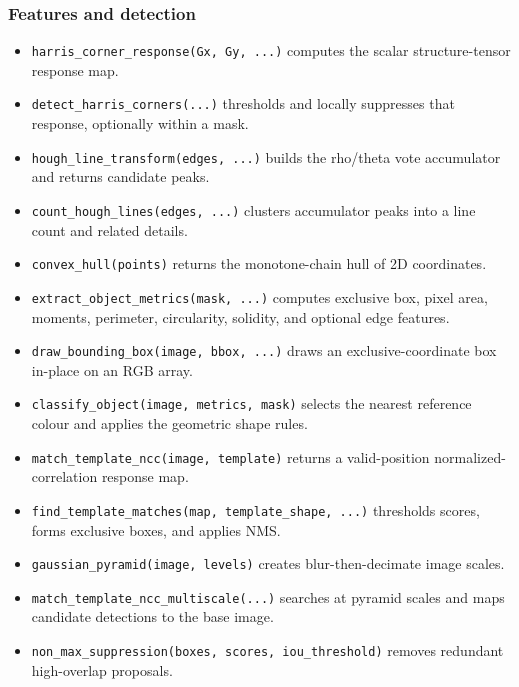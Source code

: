 \documentclass[11pt,a4paper]{article}
\newcommand{\1}{\mathbf{1}}
\begin{document}
\subsubsection{Features and detection}
\begin{itemize}
 \item \texttt{harris\_corner\_response(Gx, Gy, ...)} computes the scalar structure-tensor response map.
 \item \texttt{detect\_harris\_corners(...)} thresholds and locally suppresses that response, optionally within a mask.
 \item \texttt{hough\_line\_transform(edges, ...)} builds the rho/theta vote accumulator and returns candidate peaks.
 \item \texttt{count\_hough\_lines(edges, ...)} clusters accumulator peaks into a line count and related details.
 \item \texttt{convex\_hull(points)} returns the monotone-chain hull of 2D coordinates.
 \item \texttt{extract\_object\_metrics(mask, ...)} computes exclusive box, pixel area, moments, perimeter, circularity, solidity, and optional edge features.
 \item \texttt{draw\_bounding\_box(image, bbox, ...)} draws an exclusive-coordinate box in-place on an RGB array.
 \item \texttt{classify\_object(image, metrics, mask)} selects the nearest reference colour and applies the geometric shape rules.
 \item \texttt{match\_template\_ncc(image, template)} returns a valid-position normalized-correlation response map.
 \item \texttt{find\_template\_matches(map, template\_shape, ...)} thresholds scores, forms exclusive boxes, and applies NMS.
 \item \texttt{gaussian\_pyramid(image, levels)} creates blur-then-decimate image scales.
 \item \texttt{match\_template\_ncc\_multiscale(...)} searches at pyramid scales and maps candidate detections to the base image.
 \item \texttt{non\_max\_suppression(boxes, scores, iou\_threshold)} removes redundant high-overlap proposals.
\end{itemize}
\end{document}
